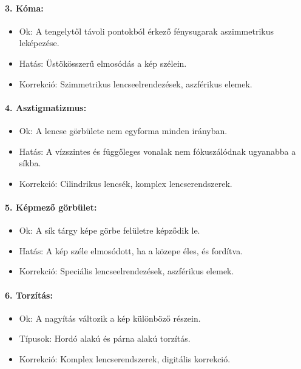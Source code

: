 \documentclass[a4paper,12pt]{article}
\begin{document}
\paragraph{3. Kóma:} \begin{itemize} \item Ok: A tengelytől távoli pontokból érkező fénysugarak aszimmetrikus leképezése. \item Hatás: Üstökösszerű elmosódás a kép szélein. \item Korrekció: Szimmetrikus lencseelrendezések, aszférikus elemek. \end{itemize}

\paragraph{4. Asztigmatizmus:} \begin{itemize} \item Ok: A lencse görbülete nem egyforma minden irányban. \item Hatás: A vízszintes és függőleges vonalak nem fókuszálódnak ugyanabba a síkba. \item Korrekció: Cilindrikus lencsék, komplex lencserendszerek. \end{itemize}

\paragraph{5. Képmező görbület:} \begin{itemize} \item Ok: A sík tárgy képe görbe felületre képződik le. \item Hatás: A kép széle elmosódott, ha a közepe éles, és fordítva. \item Korrekció: Speciális lencseelrendezések, aszférikus elemek. \end{itemize}

\paragraph{6. Torzítás:} \begin{itemize} \item Ok: A nagyítás változik a kép különböző részein. \item Típusok: Hordó alakú és párna alakú torzítás. \item Korrekció: Komplex lencserendszerek, digitális korrekció. \end{itemize}
\end{document}
